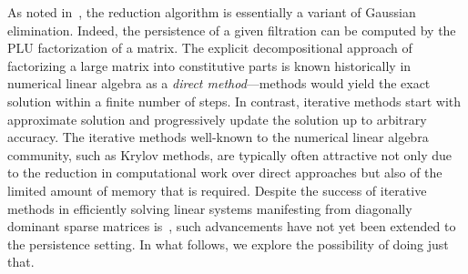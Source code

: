 \documentclass[10pt]{article}
\numberwithin{equation}{section}
\newcommand{\+}{%
	\raisebox{0.18ex}{\scaleobj{0.55}{+}}
}
\theoremstyle{definition}
\begin{document}
As noted in~\cite{dey2022computational}, the reduction algorithm is essentially a variant of Gaussian elimination. Indeed, the persistence of a given filtration can be computed by the PLU factorization of a matrix.
The explicit decompositional approach of factorizing a large matrix into constitutive parts is known historically in numerical linear algebra as a \emph{direct method}---methods would yield the exact solution within a finite number of steps. 
In contrast, iterative methods start with approximate solution and progressively update the solution up to arbitrary accuracy. 
The iterative methods well-known to the numerical linear algebra community, such as Krylov methods, are typically often attractive not only due to the reduction in computational work over direct approaches but also of the limited amount of memory that is required. 
Despite the success of iterative methods in efficiently solving linear systems manifesting from diagonally dominant sparse matrices is~\cite{}, such advancements have not yet been extended to the persistence setting. 
In what follows, we explore the possibility of doing just that. 
\end{document}

